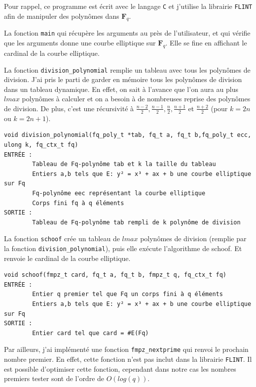 \documentclass{article}%
\theoremstyle{plain}
\theoremstyle{definition}
\theoremstyle{plain}
\theoremstyle{plain}
\theoremstyle{remark}
\newcommand\fq{\mathbf{F}_{q}}
\begin{document}
Pour rappel, ce programme est écrit avec le langage \verb|C| et j'utilise la librairie \verb|FLINT| afin de manipuler des polynômes dans $\fq$.
\begin{list}{•}{J'ai choisi de décomposer mon programme en trois parties :}
\item La fonction  \verb|main| qui récupère les arguments au près de l'utilisateur, et qui vérifie que les arguments donne une courbe elliptique sur $\fq$.
Elle se fine en affichant le cardinal de la courbe elliptique.
\item La fonction \verb|division_polynomial| remplie un tableau avec tous les polynômes de division.
J'ai pris le parti de garder en mémoire tous les polynômes de division dans un tableau dynamique.
En effet, on sait à l'avance que l'on aura au plus $lmax$ polynômes à calculer et on a besoin à de nombreuses reprise des polynômes de division.
De plus, c'est une récursivité à $\frac{n-2}{2}, \frac{n-1}{2},\frac{n}{2},\frac{n+1}{2}$ et $\frac{n+2}{2}$ (pour $k=2n$ ou $k=2n+1$).


\begin{verbatim}
void division_polynomial(fq_poly_t *tab, fq_t a, fq_t b,fq_poly_t ecc,
ulong k, fq_ctx_t fq)
ENTRÉE :
    	Tableau de Fq-polynôme tab et k la taille du tableau
    	Entiers a,b tels que E: y² = x³ + ax + b une courbe elliptique sur Fq
    	Fq-polynôme eec représentant la courbe elliptique
    	Corps fini fq à q éléments
SORTIE :
    	Tableau de Fq-polynôme tab rempli de k polynôme de division
\end{verbatim} 
\item La fonction \verb|schoof| crée un tableau de $lmax$ polynômes de division (remplie par la fonction \verb|division_polynomial|), puis elle exécute l'algorithme de schoof. Et renvoie le cardinal de la courbe elliptique.
\begin{verbatim}
void schoof(fmpz_t card, fq_t a, fq_t b, fmpz_t q, fq_ctx_t fq)
ENTRÉE :
    	Entier q premier tel que Fq un corps fini à q éléments
    	Entiers a,b tels que E: y² = x³ + ax + b une courbe elliptique sur Fq
SORTIE :
    	Entier card tel que card = #E(Fq)
\end{verbatim} 
\end{list}

Par ailleurs, j'ai implémenté une fonction \verb|fmpz_nextprime| qui renvoi le prochain nombre premier. 
En effet, cette fonction n'est pas inclut dans la librairie \verb|FLINT|. Il est possible d'optimiser cette fonction, cependant dans notre cas les nombres premiers tester sont de l'ordre de $O(log(q))$.
 
\end{document}
